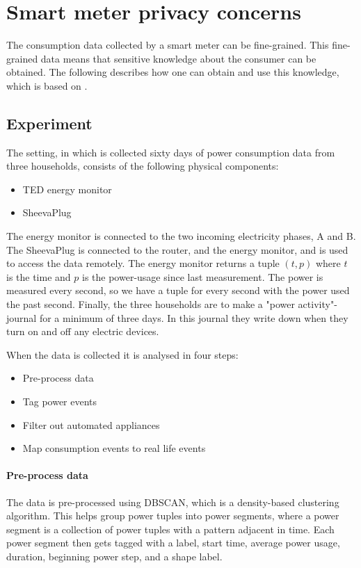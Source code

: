 \section{Smart meter privacy concerns}\label{smart_meter_privacy}
The consumption data collected by a smart meter can be fine-grained.
This fine-grained data means that sensitive knowledge about the consumer can be obtained.
The following describes how one can obtain and use this knowledge, which is based on \citet{privacy_memoir}.

\subsection{Experiment}
The setting, in which is collected sixty days of power consumption data from three households, consists of the following physical components:
\begin{itemize}
\item TED energy monitor
\item SheevaPlug
\end{itemize}
The energy monitor is connected to the two incoming electricity phases, A and B.\cite{TED_installation_guide}
The SheevaPlug is connected to the router, and the energy monitor, and is used to access the data remotely.
The energy monitor returns a tuple $(t,p)$ where $t$ is the time and $p$ is the power-usage since last measurement.
The power is measured every second, so we have a tuple for every second with the power used the past second.
Finally, the three households are to make a "power activity"-journal for a minimum of three days.
In this journal they write down when they turn on and off any electric devices.

When the data is collected it is analysed in four steps:
\begin{itemize}
\item Pre-process data
\item Tag power events
\item Filter out automated appliances
\item Map consumption events to real life events
\end{itemize}

\paragraph{Pre-process data}
The data is pre-processed using DBSCAN, which is a density-based clustering algorithm.
This helps group power tuples into power segments, where a power segment is a collection of power tuples with a pattern adjacent in time.
Each power segment then gets tagged with a label, start time, average power usage, duration, beginning power step, and a shape label.

